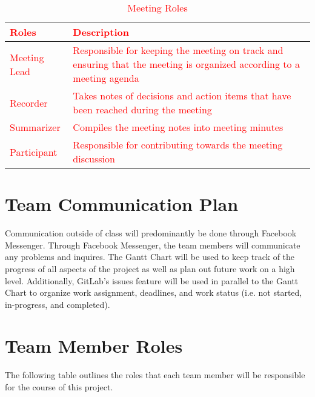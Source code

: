 \documentclass[12pt, titlepage]{article}
\begin{document}
\begin{table}[H]
    \centering
    \caption{\textcolor{red}{Meeting Roles}}
    \vspace{5pt}
    \begin{tabular}{|p{}|p{}|}
        \hline
        \textbf{\textcolor{red}{Roles}} & \textbf{\textcolor{red}{Description}}\\
        \hline
        \textcolor{red}{Meeting Lead} & \textcolor{red}{Responsible for keeping the meeting on track and ensuring that the meeting is organized according to a meeting agenda} \\
        \hline
        \textcolor{red}{Recorder} & \textcolor{red}{Takes notes of decisions and action items that have been reached during the meeting}\\
        \hline
        \textcolor{red}{Summarizer} & \textcolor{red}{Compiles the meeting notes into meeting minutes} \\
        \hline
        \textcolor{red}{Participant} & \textcolor{red}{Responsible for contributing towards the meeting discussion} \\
        \hline
    \end{tabular}
    
    \label{meetingRoles}
\end{table}

\section{Team Communication Plan}
Communication outside of class will predominantly be done through Facebook Messenger. Through Facebook Messenger, the team members will communicate any problems and inquires. The Gantt Chart will be used to keep track of the progress of all aspects of the project as well as plan out future work on a high level. Additionally, GitLab's issues feature will be used in parallel to the Gantt Chart to organize work assignment, deadlines, and work status (i.e. not started, in-progress, and completed).

\section{Team Member Roles}
The following table outlines the roles that each team member will be responsible for the course of this project.
\end{document}
